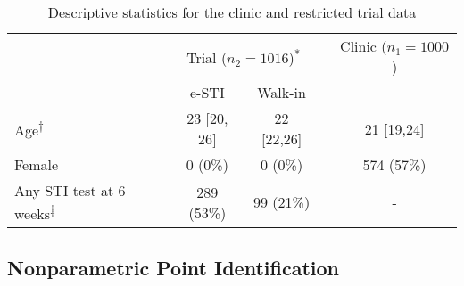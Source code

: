 \documentclass[]{article}
\begin{document}
\begin{table}[]
	\caption{Descriptive statistics for the clinic and restricted trial data}
	\centering
	\begin{tabular}{lcccc}
		\hline
		& \multicolumn{2}{c}{Trial ($n_2=1016$)\textsuperscript{*}} &  & Clinic ($n_1=1000$) \\
		& e-STI               & Walk-in           &  &                     \\ \cline{2-3} \cline{5-5} 
		Age\textsuperscript{†}                     & 23 {[}20, 26{]}     & 22 {[}22,26{]}    &  & 21 {[}19,24{]}      \\
		Female                   & 0 (0\%)             & 0 (0\%)           &  & 574 (57\%)          \\
		Any STI test at 6 weeks\textsuperscript{‡} & 289 (53\%)          & 99 (21\%)         &  & -                   \\ \hline
	\end{tabular}
	\label{tab1}
\end{table}

\subsection*{Nonparametric Point Identification}
\end{document}

